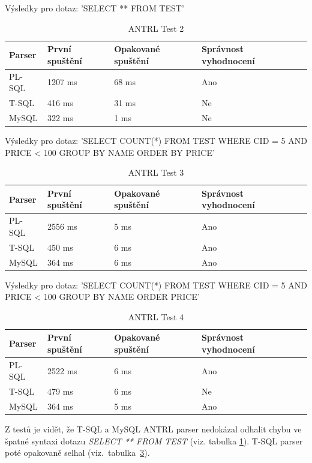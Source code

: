 \documentclass[czech,bachelor,public,dept460,male,cpdeclaration,twoside]{diploma}
\begin{document}
\begin{table}[!htbp]
	\centering
	\caption{ANTRL Test 2}
	Výsledky pro dotaz: 'SELECT ** FROM TEST'
	\vskip 0.1cm
	\label{tab:antrl2}
	\begin{tabular}{lllll}
		\toprule
		Parser & První spuštění & Opakované spuštění & Správnost vyhodnocení\\
		\midrule
		PL-SQL & 1207 ms & 68 ms & Ano \\
        T-SQL & 416 ms &31 ms & Ne \\
        MySQL & 322 ms & 1 ms & Ne \\
		\midrule
	\end{tabular}
\end{table}

\begin{table}[!htbp]
	\centering
	\caption{ANTRL Test 3}
	Výsledky pro dotaz: 'SELECT COUNT(*) FROM TEST WHERE CID = 5 AND PRICE < 100 GROUP BY NAME ORDER BY PRICE'
	\vskip 0.1cm
	\label{tab:antrl3}
	\begin{tabular}{lllll}
		\toprule
		Parser & První spuštění & Opakované spuštění & Správnost vyhodnocení\\
		\midrule
		PL-SQL & 2556 ms & 5 ms & Ano \\
        T-SQL & 450 ms & 6 ms & Ano \\
        MySQL & 364 ms & 6 ms & Ano \\
		\midrule
	\end{tabular}
\end{table}

\begin{table}[!htbp]
	\centering
	\caption{ANTRL Test 4}
	Výsledky pro dotaz: 'SELECT COUNT(*) FROM TEST WHERE CID = 5 AND PRICE < 100 GROUP BY NAME ORDER PRICE'
	\vskip 0.1cm
	\label{tab:antrl4}
	\begin{tabular}{lllll}
		\toprule
		Parser & První spuštění & Opakované spuštění & Správnost vyhodnocení\\
		\midrule
		PL-SQL & 2522 ms & 6 ms & Ano \\
        T-SQL & 479 ms & 6 ms & Ne \\
        MySQL & 364 ms & 5 ms & Ano \\
		\midrule
	\end{tabular}
\end{table}


Z testů je vidět, že T-SQL a MySQL ANTRL parser nedokázal odhalit chybu ve špatné syntaxi dotazu \textit{SELECT ** FROM TEST} (viz. tabulka \ref{tab:antrl2}). T-SQL parser poté opakovaně selhal (viz.~tabulka~\ref{tab:antrl4}).
\end{document}
